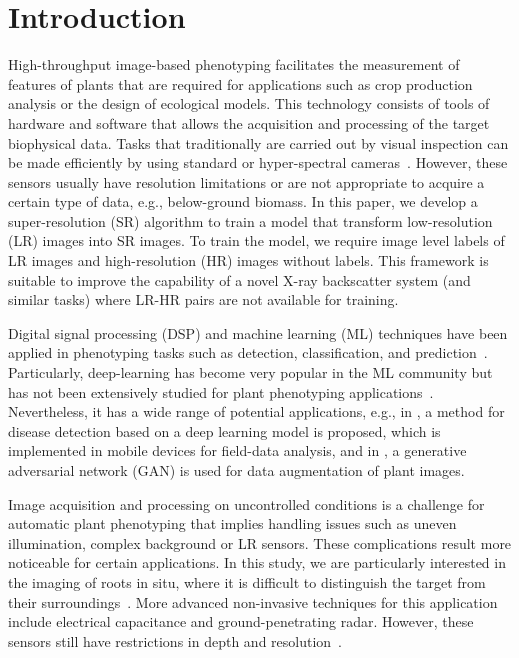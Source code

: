 \documentclass[10pt,twocolumn,letterpaper]{article}
\begin{document}
\section{Introduction}
High-throughput image-based phenotyping facilitates the measurement of features of plants that are required for applications such as crop production analysis or the design of ecological models. This technology consists of tools of hardware and software that allows the acquisition and processing of the target biophysical data. Tasks that traditionally are carried out by visual inspection can be made efficiently by using standard or hyper-spectral cameras~\cite{Fahlgren2015}. However, these sensors usually have resolution limitations or are not appropriate to acquire a certain type of data, e.g., below-ground biomass. In this paper, we develop a super-resolution (SR) algorithm to train a model that transform low-resolution (LR) images into SR images. To train the model, we require image level labels of LR images and high-resolution (HR) images without labels. This framework is suitable to improve the capability of a novel X-ray backscatter system (and similar tasks) where LR-HR pairs are not available for training. 


Digital signal processing (DSP) and machine learning (ML) techniques have been applied in phenotyping tasks such as detection, classification, and prediction~\cite{Singh2018}. Particularly, deep-learning has become very popular in the ML community but has not been extensively studied for plant phenotyping applications~\cite{Ubbens2017}. Nevertheless, it has a wide range of potential applications, e.g., in \cite{Ramcharan2017}, a method for disease detection based on a deep learning model is proposed, which is implemented in mobile devices for field-data analysis, and in \cite{Giuffrida2017}, a generative adversarial network (GAN) is used for data augmentation of plant images.

Image acquisition and processing on uncontrolled conditions is a challenge for automatic plant phenotyping that implies handling issues such as uneven illumination, complex background or LR sensors. These complications result more noticeable for certain applications. In this study, we are particularly interested in the imaging of roots in situ, where it is difficult to distinguish the target from their surroundings~\cite{Tabb2018}. More advanced non-invasive techniques for this application include electrical capacitance and ground-penetrating radar. However, these sensors still have restrictions in depth and resolution~\cite{Araus2014}.
\end{document}
